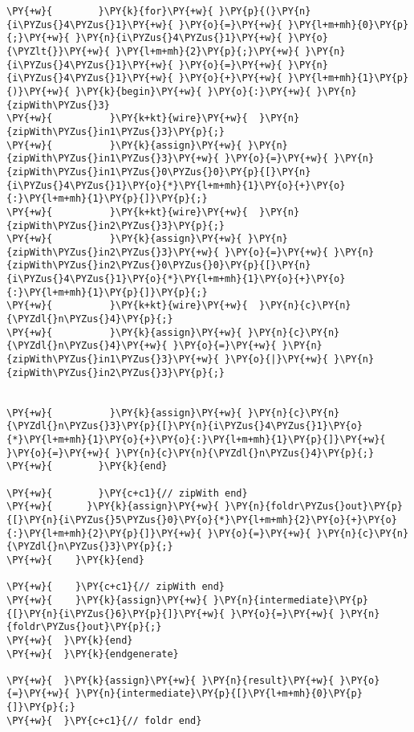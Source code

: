 {\begin{Verbatim}[commandchars=\\\{\}]
\PY{+w}{        }\PY{k}{for}\PY{+w}{ }\PY{p}{(}\PY{n}{i\PYZus{}4\PYZus{}1}\PY{+w}{ }\PY{o}{=}\PY{+w}{ }\PY{l+m+mh}{0}\PY{p}{;}\PY{+w}{ }\PY{n}{i\PYZus{}4\PYZus{}1}\PY{+w}{ }\PY{o}{\PYZlt{}}\PY{+w}{ }\PY{l+m+mh}{2}\PY{p}{;}\PY{+w}{ }\PY{n}{i\PYZus{}4\PYZus{}1}\PY{+w}{ }\PY{o}{=}\PY{+w}{ }\PY{n}{i\PYZus{}4\PYZus{}1}\PY{+w}{ }\PY{o}{+}\PY{+w}{ }\PY{l+m+mh}{1}\PY{p}{)}\PY{+w}{ }\PY{k}{begin}\PY{+w}{ }\PY{o}{:}\PY{+w}{ }\PY{n}{zipWith\PYZus{}3}
\PY{+w}{          }\PY{k+kt}{wire}\PY{+w}{  }\PY{n}{zipWith\PYZus{}in1\PYZus{}3}\PY{p}{;}
\PY{+w}{          }\PY{k}{assign}\PY{+w}{ }\PY{n}{zipWith\PYZus{}in1\PYZus{}3}\PY{+w}{ }\PY{o}{=}\PY{+w}{ }\PY{n}{zipWith\PYZus{}in1\PYZus{}0\PYZus{}0}\PY{p}{[}\PY{n}{i\PYZus{}4\PYZus{}1}\PY{o}{*}\PY{l+m+mh}{1}\PY{o}{+}\PY{o}{:}\PY{l+m+mh}{1}\PY{p}{]}\PY{p}{;}
\PY{+w}{          }\PY{k+kt}{wire}\PY{+w}{  }\PY{n}{zipWith\PYZus{}in2\PYZus{}3}\PY{p}{;}
\PY{+w}{          }\PY{k}{assign}\PY{+w}{ }\PY{n}{zipWith\PYZus{}in2\PYZus{}3}\PY{+w}{ }\PY{o}{=}\PY{+w}{ }\PY{n}{zipWith\PYZus{}in2\PYZus{}0\PYZus{}0}\PY{p}{[}\PY{n}{i\PYZus{}4\PYZus{}1}\PY{o}{*}\PY{l+m+mh}{1}\PY{o}{+}\PY{o}{:}\PY{l+m+mh}{1}\PY{p}{]}\PY{p}{;}
\PY{+w}{          }\PY{k+kt}{wire}\PY{+w}{  }\PY{n}{c}\PY{n}{\PYZdl{}n\PYZus{}4}\PY{p}{;}
\PY{+w}{          }\PY{k}{assign}\PY{+w}{ }\PY{n}{c}\PY{n}{\PYZdl{}n\PYZus{}4}\PY{+w}{ }\PY{o}{=}\PY{+w}{ }\PY{n}{zipWith\PYZus{}in1\PYZus{}3}\PY{+w}{ }\PY{o}{|}\PY{+w}{ }\PY{n}{zipWith\PYZus{}in2\PYZus{}3}\PY{p}{;}


\PY{+w}{          }\PY{k}{assign}\PY{+w}{ }\PY{n}{c}\PY{n}{\PYZdl{}n\PYZus{}3}\PY{p}{[}\PY{n}{i\PYZus{}4\PYZus{}1}\PY{o}{*}\PY{l+m+mh}{1}\PY{o}{+}\PY{o}{:}\PY{l+m+mh}{1}\PY{p}{]}\PY{+w}{ }\PY{o}{=}\PY{+w}{ }\PY{n}{c}\PY{n}{\PYZdl{}n\PYZus{}4}\PY{p}{;}
\PY{+w}{        }\PY{k}{end}

\PY{+w}{        }\PY{c+c1}{// zipWith end}
\PY{+w}{      }\PY{k}{assign}\PY{+w}{ }\PY{n}{foldr\PYZus{}out}\PY{p}{[}\PY{n}{i\PYZus{}5\PYZus{}0}\PY{o}{*}\PY{l+m+mh}{2}\PY{o}{+}\PY{o}{:}\PY{l+m+mh}{2}\PY{p}{]}\PY{+w}{ }\PY{o}{=}\PY{+w}{ }\PY{n}{c}\PY{n}{\PYZdl{}n\PYZus{}3}\PY{p}{;}
\PY{+w}{    }\PY{k}{end}

\PY{+w}{    }\PY{c+c1}{// zipWith end}
\PY{+w}{    }\PY{k}{assign}\PY{+w}{ }\PY{n}{intermediate}\PY{p}{[}\PY{n}{i\PYZus{}6}\PY{p}{]}\PY{+w}{ }\PY{o}{=}\PY{+w}{ }\PY{n}{foldr\PYZus{}out}\PY{p}{;}
\PY{+w}{  }\PY{k}{end}
\PY{+w}{  }\PY{k}{endgenerate}

\PY{+w}{  }\PY{k}{assign}\PY{+w}{ }\PY{n}{result}\PY{+w}{ }\PY{o}{=}\PY{+w}{ }\PY{n}{intermediate}\PY{p}{[}\PY{l+m+mh}{0}\PY{p}{]}\PY{p}{;}
\PY{+w}{  }\PY{c+c1}{// foldr end}


\end{Verbatim}}
